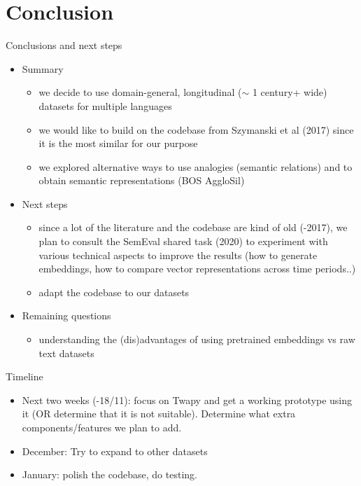 \documentclass[10pt]{beamer}
\begin{document}
\section{Conclusion}
\begin{frame}{Conclusions and next steps}
\begin{itemize}
    
    \item Summary
    \begin{itemize}
        \item we decide to use domain-general, longitudinal ($\sim$ 1 century+ wide) datasets for multiple languages
        \item we would like to build on the codebase from Szymanski et al (2017) since it is the most similar for our purpose
        \item we explored alternative ways to use analogies (semantic relations) and to obtain semantic representations (BOS AggloSil)
    \end{itemize}

    \item Next steps
    \begin{itemize}
        \item since a lot of the literature and the codebase are kind of old (-2017), we plan to consult the SemEval shared task (2020) to experiment with various technical aspects to improve the results (how to generate embeddings, how to compare vector representations across time periods..)
        \item adapt the codebase to our datasets
    \end{itemize}
    
    \item Remaining questions
    \begin{itemize}
        \item understanding the (dis)advantages of using pretrained embeddings vs raw text datasets
    \end{itemize}
\end{itemize}
\end{frame}

\begin{frame}{Timeline}
\begin{itemize}
    
    \item Next two weeks (-18/11): focus on Twapy and get a working prototype using it (OR determine that it is not suitable). Determine what extra components/features we plan to add.

    \item December: Try to expand to other datasets

    \item January: polish the codebase, do testing.
\end{itemize}
\end{frame}
\end{document}
